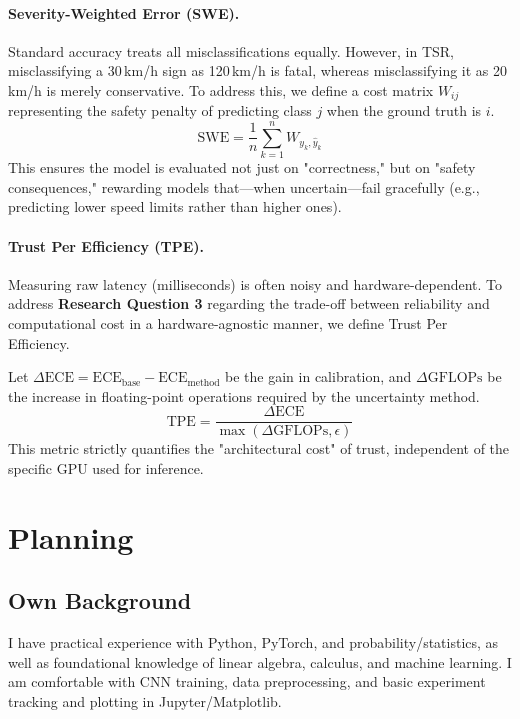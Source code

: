 \documentclass[11pt,a4paper]{article}
\begin{document}
\paragraph{Severity-Weighted Error (SWE).}
Standard accuracy treats all misclassifications equally. However, in TSR, misclassifying a 30\,km/h sign as 120\,km/h is fatal, whereas misclassifying it as 20\,km/h is merely conservative.
To address this, we define a cost matrix $W_{ij}$ representing the safety penalty of predicting class $j$ when the ground truth is $i$.
$$
\mathrm{SWE} = \frac{1}{n} \sum_{k=1}^{n} W_{y_k, \hat{y}_k}
$$
This ensures the model is evaluated not just on "correctness," but on "safety consequences," rewarding models that—when uncertain—fail gracefully (e.g., predicting lower speed limits rather than higher ones).

\paragraph{Trust Per Efficiency (TPE).}
Measuring raw latency (milliseconds) is often noisy and hardware-dependent. To address \textbf{Research Question 3} regarding the trade-off between reliability and computational cost in a hardware-agnostic manner, we define Trust Per Efficiency.

Let $\Delta \mathrm{ECE} = \mathrm{ECE}_{\text{base}} - \mathrm{ECE}_{\text{method}}$ be the gain in calibration, and $\Delta \mathrm{GFLOPs}$ be the increase in floating-point operations required by the uncertainty method.
$$
\mathrm{TPE} = \frac{\Delta \mathrm{ECE}}{\max(\Delta \mathrm{GFLOPs}, \epsilon)}
$$
This metric strictly quantifies the "architectural cost" of trust, independent of the specific GPU used for inference.

\section{Planning}

\subsection{Own Background}

I have practical experience with Python, PyTorch, and probability/statistics, as well as foundational knowledge of linear algebra, calculus, and machine learning. I am comfortable with CNN training, data preprocessing, and basic experiment tracking and plotting in Jupyter/Matplotlib.
\end{document}
